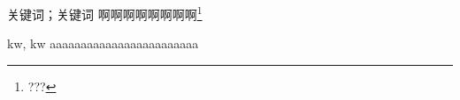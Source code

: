 \begin{中文摘要}{关键词；关键词}
  啊啊啊啊啊啊啊啊\footnote{???}
\end{中文摘要}

\begin{英文摘要}{kw, kw}
  aaaaaaaaaaaaaaaaaaaaaaaa
\end{英文摘要}